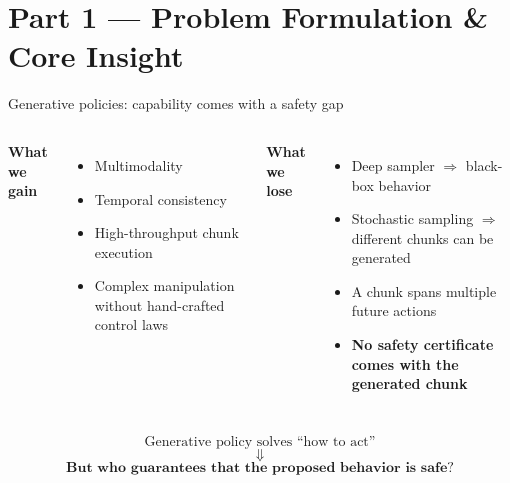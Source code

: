 \documentclass[aspectratio=169]{beamer}
\newcommand{\good}[1]{\textcolor{green!40!black}{#1}}
\newcommand{\bad}[1]{\textcolor{red!60!black}{#1}}
\begin{document}
\section{Part 1 --- Problem Formulation \& Core Insight}
\begin{frame}[t,shrink=8]{Generative policies: capability comes with a safety gap}
\begin{columns}[T]

\textbf{\good{What we gain}}
\begin{itemize}
    \item Multimodality
    \item Temporal consistency
    \item High-throughput chunk execution
    \item Complex manipulation without hand-crafted control laws
\end{itemize}

\textbf{\bad{What we lose}}
\begin{itemize}
    \item Deep sampler $\Rightarrow$ black-box behavior
    \item Stochastic sampling $\Rightarrow$ different chunks can be generated
    \item A chunk spans multiple future actions
    \item \textbf{No safety certificate comes with the generated chunk}
\end{itemize}

\end{columns}
\vspace{7pt}
\begin{center}
\Large
\[
\boxed{
\text{Generative policy solves ``how to act''}
}
\]
\[
\Downarrow
\]
\[
\boxed{
\textbf{But who guarantees that the proposed behavior is safe?}
}
\]
\end{center}
\end{frame}
\end{document}

